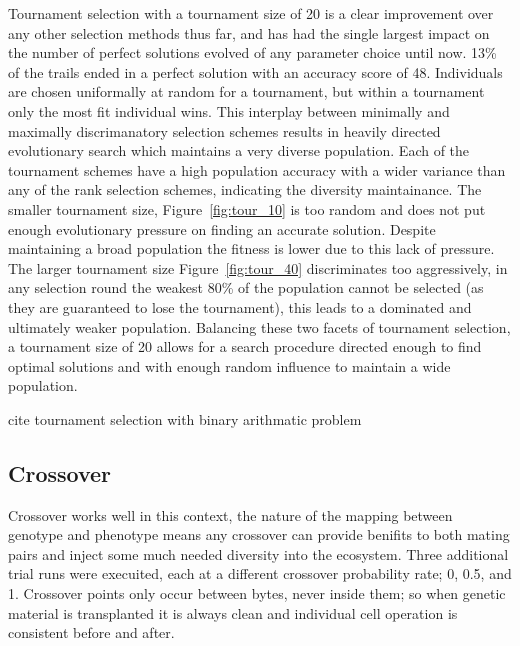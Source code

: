 Tournament selection with a tournament size of 20 is a clear improvement over
any other selection methods thus far, and has had the single largest impact
on the number of perfect solutions evolved of any parameter choice until
now. 13\% of the trails ended in a perfect solution with an accuracy score of 48.
Individuals are chosen uniformally at random for a tournament, but within a
tournament only the most fit individual wins. This interplay between minimally
and maximally discrimanatory selection schemes results in heavily directed evolutionary
search which maintains a very diverse population. Each of the tournament schemes
have a high population accuracy with a wider variance than any of the rank
selection schemes, indicating the diversity maintainance. The smaller tournament
size, Figure~\ref{fig:tour_10} is too random and does not put enough evolutionary
pressure on finding an accurate solution.
Despite maintaining a broad population the fitness is lower due to this lack of
pressure. The larger tournament size Figure~\ref{fig:tour_40} discriminates too
aggressively, in any selection round the weakest 80\% of the population cannot
be selected (as they are guaranteed to lose the tournament), this leads to a
dominated and ultimately weaker population.
Balancing these two facets of tournament selection, a tournament size
of 20 allows for a search procedure directed enough to find optimal solutions
and with enough random influence to maintain a wide population.

\todo cite tournament selection with binary arithmatic problem

\subsection{Crossover}
Crossover works well in this context, the nature of the mapping between genotype
and phenotype means any crossover can provide benifits to both mating pairs and
inject some much needed diversity into the ecosystem. Three additional trial runs
were execuited, each at a different crossover probability rate; 0, 0.5, and 1.
Crossover points only occur between bytes, never inside them; so
when genetic material is transplanted it is always clean and individual cell
operation is consistent before and after.

